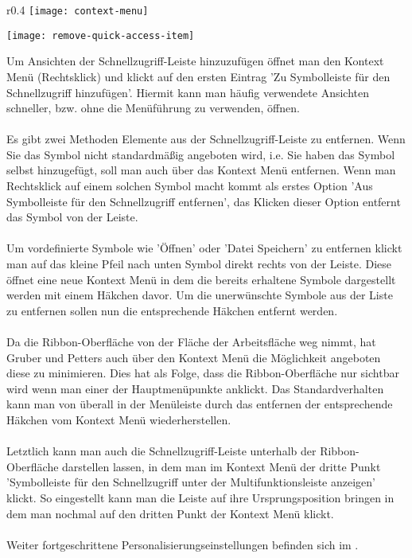 \begin{wrapfigure}{r}{0.4\textwidth}
	\vspace{-4pt}
	\texttt{[image: context-menu]}
	\vspace{-5pt}
	\caption{Kontext Menü}
	\label{fig:context-menu}
	\vspace{50pt}
	\texttt{[image: remove-quick-access-item]}
	\vspace{-5pt}
	\caption{Vordefinierte Symbole\newline Entfernen}
	\label{fig:remove-quick-access-item}
	\vspace{4pt}
\end{wrapfigure}

\noindent
Um Ansichten der Schnellzugriff-Leiste hinzuzufügen öffnet man den Kontext Menü (Rechtsklick) und klickt auf den ersten Eintrag 'Zu Symbolleiste für den Schnellzugriff hinzufügen'. Hiermit kann man häufig verwendete Ansichten schneller, bzw. ohne die Menüführung zu verwenden, öffnen.\\
\\
Es gibt zwei Methoden Elemente aus der Schnellzugriff-Leiste zu entfernen. Wenn Sie das Symbol nicht standardmäßig angeboten wird, i.e. Sie haben das Symbol selbst hinzugefügt, soll man auch über das Kontext Menü entfernen. Wenn man Rechtsklick auf einem solchen Symbol macht kommt als erstes Option 'Aus Symbolleiste für den Schnellzugriff entfernen', das Klicken dieser Option entfernt das Symbol von der Leiste.\\
\\
Um vordefinierte Symbole wie 'Öffnen' oder 'Datei Speichern' zu entfernen klickt man auf das kleine Pfeil nach unten Symbol direkt rechts von der Leiste. Diese öffnet eine neue Kontext Menü in dem die bereits erhaltene Symbole dargestellt werden mit einem Häkchen davor. Um die unerwünschte Symbole aus der Liste zu entfernen sollen nun die entsprechende Häkchen entfernt werden.\\
\\
Da die Ribbon-Oberfläche von der Fläche der Arbeitsfläche weg nimmt, hat Gruber und Petters auch über den Kontext Menü die Möglichkeit angeboten diese zu minimieren. Dies hat als Folge, dass die Ribbon-Oberfläche nur sichtbar wird wenn man einer der Hauptmenüpunkte anklickt. Das Standardverhalten kann man von überall in der Menüleiste durch das entfernen der entsprechende Häkchen vom Kontext Menü wiederherstellen.\\
\\
Letztlich kann man auch die Schnellzugriff-Leiste unterhalb der Ribbon-Oberfläche darstellen lassen, in dem man im Kontext Menü der dritte Punkt 'Symbolleiste für den Schnellzugriff unter der Multifunktionsleiste anzeigen' klickt. So eingestellt kann man die Leiste auf ihre Ursprungsposition bringen in dem man nochmal auf den dritten Punkt der Kontext Menü klickt.\\
\\
Weiter fortgeschrittene Personalisierungseinstellungen befinden sich im .

